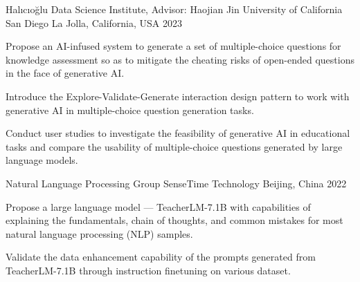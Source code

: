 

\begin{cventries}


  \cventry
    {Halıcıoğlu Data Science Institute, Advisor: Haojian Jin} %
    {University of California San Diego} %
    {La Jolla, California, USA} %
    {2023} %
    {
      \begin{cvitems} %
        \item {Propose an AI-infused system to generate a set of multiple-choice questions for knowledge assessment so as to mitigate the cheating risks of open-ended questions in the face of generative AI.}
        \item {Introduce the Explore-Validate-Generate interaction design pattern to work with generative AI in multiple-choice question generation tasks.}
        \item {Conduct user studies to investigate the feasibility of generative AI in educational tasks and compare the usability of multiple-choice questions generated by large language models.}
      \end{cvitems}
    }
  
  \cventry
    {Natural Language Processing Group}
    {SenseTime Technology} 
    {Beijing, China} %
    {2022} %
    {
      \begin{cvitems} %
        \item Propose a large language model --- TeacherLM-7.1B with capabilities of explaining the fundamentals, chain of thoughts, and common mistakes for most natural language processing (NLP) samples.
        \item Validate the data enhancement capability of the prompts generated from TeacherLM-7.1B through instruction finetuning on various dataset.
      \end{cvitems}
    }


\end{cventries}
